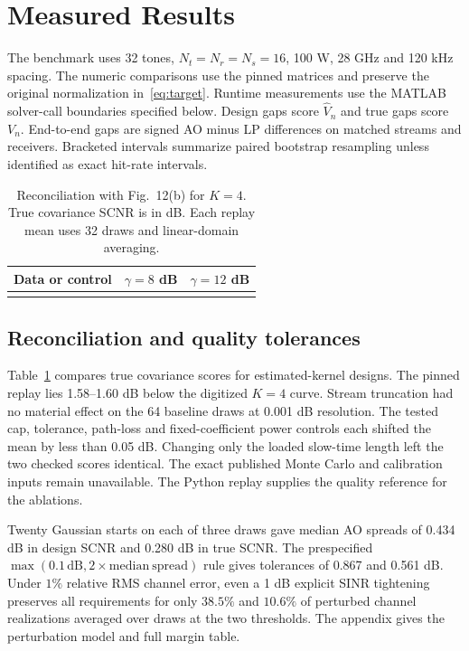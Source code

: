 \documentclass[journal]{IEEEtran}
\makeatletter
\newcommand{\TabRows}[1]{\@@input{#1}}
\providecommand{\LetterAssets}{../../results/partf-2026-11-23/assets}
\makeatother
\begin{document}
\section{Measured Results}
The benchmark uses 32 tones, \(N_t=N_r=N_s=16\), 100 W, 28 GHz and 120 kHz spacing. The numeric comparisons use the pinned matrices and preserve the original normalization in~\eqref{eq:target}. Runtime measurements use the MATLAB solver-call boundaries specified below. Design gaps score \(\widehat V_n\) and true gaps score \(V_n\). End-to-end gaps are signed AO minus LP differences on matched streams and receivers. Bracketed intervals summarize paired bootstrap resampling unless identified as exact hit-rate intervals.

\begin{table}[t]
 \caption{Reconciliation with Fig.~12(b) for \(K=4\). True covariance SCNR is in dB. Each replay mean uses 32 draws and linear-domain averaging.}
 \label{tab:reconciliation}
 \centering\footnotesize
 \begin{tabular}{@{}lrr@{}}
 \toprule
 Data or control & \(\gamma=8\) dB & \(\gamma=12\) dB\\
 \midrule
 \TabRows{\LetterAssets/reconciliation.tex}
 \bottomrule
 \end{tabular}
\end{table}

\subsection{Reconciliation and quality tolerances}
Table~\ref{tab:reconciliation} compares true covariance scores for estimated-kernel designs. The pinned replay lies 1.58--1.60 dB below the digitized \(K=4\) curve. Stream truncation had no material effect on the 64 baseline draws at 0.001 dB resolution. The tested cap, tolerance, path-loss and fixed-coefficient power controls each shifted the mean by less than 0.05 dB. Changing only the loaded slow-time length left the two checked scores identical. The exact published Monte Carlo and calibration inputs remain unavailable. The Python replay supplies the quality reference for the ablations.

Twenty Gaussian starts on each of three draws gave median AO spreads of 0.434 dB in design SCNR and 0.280 dB in true SCNR. The prespecified \(\max(0.1\,\mathrm{dB},2\times\mathrm{median\ spread})\) rule gives tolerances of 0.867 and 0.561 dB. Under \(1\%\) relative RMS channel error, even a 1 dB explicit SINR tightening preserves all requirements for only \(38.5\%\) and \(10.6\%\) of perturbed channel realizations averaged over draws at the two thresholds. The appendix gives the perturbation model and full margin table.
\end{document}
